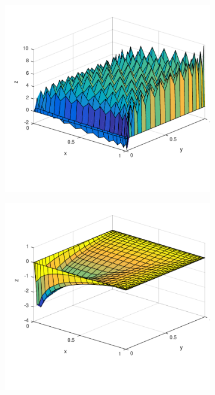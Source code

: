 %
\begin{figure}[h!]
  \centering
  \begin{subfigure}[b]{0.48\textwidth}
	\includegraphics[width=\textwidth]{Figures/Spec_difftrans_aPos.pdf}
  \end{subfigure}%
  \quad
  \begin{subfigure}[b]{0.48\textwidth}
	\includegraphics[width=\textwidth]{Figures/SpecLS_difftrans_aPos.pdf}

\end{subfigure}
\end{figure}
